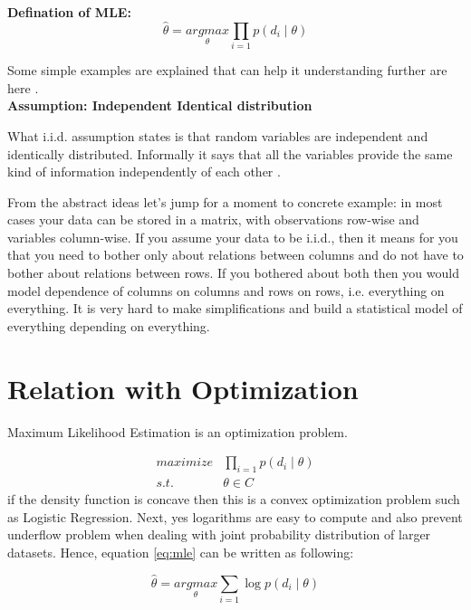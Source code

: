 \noindent \textbf{Defination of MLE:}
\begin{equation}\label{eq:mle}
    \hat{\theta} = \underset{\theta}{argmax} \prod_{i=1} p(d_i \mid \theta)
\end{equation}


Some simple examples are explained that can help it understanding further are here \cite{mit}. \\

\noindent\textbf{Assumption: Independent Identical distribution} 

\noindent What i.i.d. assumption states is that random variables are independent and identically distributed. Informally it says that all the variables provide the same kind of information independently of each other \cite{why-mle, mit, why-iid}.

From the abstract ideas let's jump for a moment to concrete example: in most cases your data can be stored in a matrix, with observations row-wise and variables column-wise. If you assume your data to be i.i.d., then it means for you that you need to bother only about relations between columns and do not have to bother about relations between rows. If you bothered about both then you would model dependence of columns on columns and rows on rows, i.e. everything on everything. It is very hard to make simplifications and build a statistical model of everything depending on everything. \cite{why-iid}


\section{Relation with Optimization}

Maximum Likelihood Estimation is an optimization problem.

\begin{equation}\label{eq:cvx_mle}
\begin{array}{cc}
    maximize & \prod_{i=1} p(d_i \mid \theta) \\
    s.t. & \theta \in C
\end{array}
\end{equation}
if the density function is concave then this is a convex optimization problem such as Logistic Regression. Next, yes logarithms are easy to compute and also prevent underflow problem when dealing with joint probability distribution of larger datasets. Hence, equation \ref{eq:mle} can be written as following:
     
\begin{equation}
    \hat{\theta} = \underset{\theta}{argmax} \sum_{i=1} \log p(d_i \mid \theta)
\end{equation}

